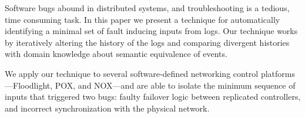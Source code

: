 Software bugs abound in distributed systems, and troubleshooting
is a tedious, time consuming task.
In this paper we present a technique for automatically identifying
a minimal set of fault inducing inputs from logs. Our technique works by
iteratively altering the history of the logs and comparing divergent histories
with domain knowledge about semantic equivalence of events.

We apply our technique to several software-defined networking control
platforms---Floodlight, POX, and NOX---and
are able to isolate the minimum sequence of inputs that triggered
two bugs: faulty failover logic between replicated controllers, and incorrect
synchronization with the physical network.
